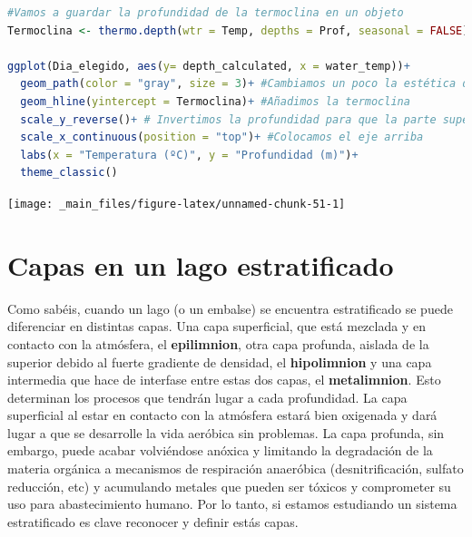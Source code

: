 \documentclass[
]{book}
\begin{document}
\begin{lstlisting}[language=R]
#Vamos a guardar la profundidad de la termoclina en un objeto
Termoclina <- thermo.depth(wtr = Temp, depths = Prof, seasonal = FALSE)

ggplot(Dia_elegido, aes(y= depth_calculated, x = water_temp))+
  geom_path(color = "gray", size = 3)+ #Cambiamos un poco la estética dándole color y grosor a la línea
  geom_hline(yintercept = Termoclina)+ #Añadimos la termoclina
  scale_y_reverse()+ # Invertimos la profundidad para que la parte superior sea 0 metros.
  scale_x_continuous(position = "top")+ #Colocamos el eje arriba
  labs(x = "Temperatura (ºC)", y = "Profundidad (m)")+
  theme_classic()
\end{lstlisting}

\texttt{[image: \_main\_files/figure-latex/unnamed-chunk-51-1]}

\hypertarget{capas-en-un-lago-estratificado}{%
\section{Capas en un lago estratificado}\label{capas-en-un-lago-estratificado}}

Como sabéis, cuando un lago (o un embalse) se encuentra estratificado se puede diferenciar en distintas capas. Una capa superficial, que está mezclada y en contacto con la atmósfera, el \textbf{epilimnion}, otra capa profunda, aislada de la superior debido al fuerte gradiente de densidad, el \textbf{hipolimnion} y una capa intermedia que hace de interfase entre estas dos capas, el \textbf{metalimnion}. Esto determinan los procesos que tendrán lugar a cada profundidad. La capa superficial al estar en contacto con la atmósfera estará bien oxigenada y dará lugar a que se desarrolle la vida aeróbica sin problemas. La capa profunda, sin embargo, puede acabar volviéndose anóxica y limitando la degradación de la materia orgánica a mecanismos de respiración anaeróbica (desnitrificación, sulfato reducción, etc) y acumulando metales que pueden ser tóxicos y comprometer su uso para abastecimiento humano. Por lo tanto, si estamos estudiando un sistema estratificado es clave reconocer y definir estás capas.
\end{document}
